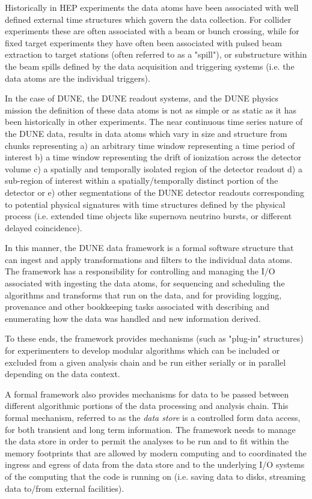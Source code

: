 \documentclass[../main-v1.tex]{subfiles}
\begin{document}
Historically in HEP experiments the data atoms have been associated with well defined external time structures which govern the data collection.  For collider experiments these are often associated with a beam or bunch crossing, while for fixed target experiments they have often been associated with pulsed beam extraction to target stations (often referred to as a "spill"), or substructure within the beam spills defined by the data acquisition and triggering systems (i.e. the data atoms are the individual triggers).  

In the case of DUNE, the DUNE readout systems, and the DUNE physics mission the definition of these data atoms is not as simple or as static as it has been historically in other experiments.  The near continuous time series nature of the DUNE data, results in data atoms which vary in size and structure from chunks representing a) an arbitrary time window representing a time period of interest b) a time window representing the drift of ionization across the detector volume c) a spatially and temporally isolated region of the detector readout d) a sub-region of interest within a spatially/temporally distinct portion of the detector or e) other segmentations of the DUNE detector readouts corresponding to potential physical signatures with time structures defined by the physical process (i.e. extended time objects like supernova neutrino bursts, or different delayed coincidence).

In this manner, the DUNE data framework is a formal software structure that can ingest and apply transformations and filters to the individual data atoms.  The framework has a responsibility for controlling and managing the I/O associated with ingesting the data atoms, for sequencing and scheduling the algorithms and transforms that run on the data, and for providing logging, provenance and other bookkeeping tasks associated with describing and enumerating how the data was handled and new information derived.  

To these ends, the framework provides mechanisms (such as "plug-in" structures) for experimenters to develop modular algorithms which can be included or excluded from a given analysis chain and be run either serially or in parallel depending on the data context. 

A formal framework also provides mechanisms for data to be passed between different algorithmic portions of the data processing and analysis chain.  This formal mechanism, referred to as the {\it data store} is a controlled form data access, for both transient and long term information.  The framework needs to manage the data store in order to permit the analyses to be run and to fit within the memory footprints that are allowed by modern computing and to coordinated the ingress and egress of data from the data store and to the underlying I/O systems of the computing that the code is running on (i.e. saving data to disks, streaming data to/from external facilities). 
\end{document}
